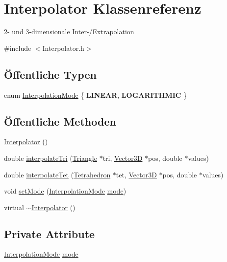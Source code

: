 \hypertarget{classInterpolator}{\section{Interpolator Klassenreferenz}
\label{classInterpolator}
}


2-\/ und 3-\/dimensionale Inter-\//\-Extrapolation  




{\ttfamily \#include $<$Interpolator.\-h$>$}

\subsection*{Öffentliche Typen}
\begin{DoxyCompactItemize}
\item 
enum \hyperlink{classInterpolator_adb733b1439a2903feae57fa734ced0c2}{Interpolation\-Mode} \{ {\bfseries L\-I\-N\-E\-A\-R}, 
{\bfseries L\-O\-G\-A\-R\-I\-T\-H\-M\-I\-C}
 \}
\end{DoxyCompactItemize}
\subsection*{Öffentliche Methoden}
\begin{DoxyCompactItemize}
\item 
\hyperlink{classInterpolator_ab8cbb0b13436fc54a4bba03804ae8f8a}{Interpolator} ()
\item 
double \hyperlink{classInterpolator_ad59ac6ed3822e08a67ac7d1ee88a5bd2}{interpolate\-Tri} (\hyperlink{classTriangle}{Triangle} $\ast$tri, \hyperlink{classVector3D}{Vector3\-D} $\ast$pos, double $\ast$values)
\item 
double \hyperlink{classInterpolator_a30e714ca6dff9b5745d029f95af1420a}{interpolate\-Tet} (\hyperlink{classTetrahedron}{Tetrahedron} $\ast$tet, \hyperlink{classVector3D}{Vector3\-D} $\ast$pos, double $\ast$values)
\item 
void \hyperlink{classInterpolator_a2f9927fc580de7d2f94d85e6ca3ee3e3}{set\-Mode} (\hyperlink{classInterpolator_adb733b1439a2903feae57fa734ced0c2}{Interpolation\-Mode} \hyperlink{classInterpolator_ace34e7696bdf4a1f0544b145efee898e}{mode})
\item 
virtual \hyperlink{classInterpolator_a6bb406dfe33e06296ccf24f18abcd46c}{$\sim$\-Interpolator} ()
\end{DoxyCompactItemize}
\subsection*{Private Attribute}
\begin{DoxyCompactItemize}
\item 
\hyperlink{classInterpolator_adb733b1439a2903feae57fa734ced0c2}{Interpolation\-Mode} \hyperlink{classInterpolator_ace34e7696bdf4a1f0544b145efee898e}{mode}
\end{DoxyCompactItemize}


